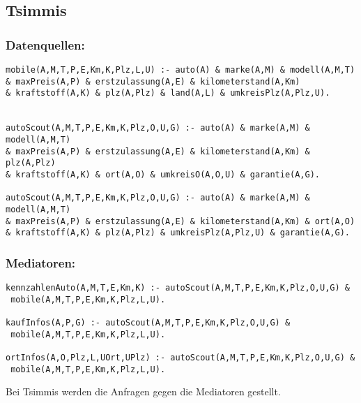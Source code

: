 \documentclass[a4paper]{article}
\begin{document}
\subsection*{Tsimmis}
\subsubsection*{Datenquellen:}
\begin{verbatim}
mobile(A,M,T,P,E,Km,K,Plz,L,U) :- auto(A) & marke(A,M) & modell(A,M,T) 
& maxPreis(A,P) & erstzulassung(A,E) & kilometerstand(A,Km) 
& kraftstoff(A,K) & plz(A,Plz) & land(A,L) & umkreisPlz(A,Plz,U).


autoScout(A,M,T,P,E,Km,K,Plz,O,U,G) :- auto(A) & marke(A,M) & modell(A,M,T) 
& maxPreis(A,P) & erstzulassung(A,E) & kilometerstand(A,Km) & plz(A,Plz)
& kraftstoff(A,K) & ort(A,O) & umkreisO(A,O,U) & garantie(A,G).

autoScout(A,M,T,P,E,Km,K,Plz,O,U,G) :- auto(A) & marke(A,M) & modell(A,M,T) 
& maxPreis(A,P) & erstzulassung(A,E) & kilometerstand(A,Km) & ort(A,O)
& kraftstoff(A,K) & plz(A,Plz) & umkreisPlz(A,Plz,U) & garantie(A,G).
\end{verbatim}

\subsubsection*{Mediatoren:}
\begin{verbatim}
kennzahlenAuto(A,M,T,E,Km,K) :- autoScout(A,M,T,P,E,Km,K,Plz,O,U,G) &
 mobile(A,M,T,P,E,Km,K,Plz,L,U).

kaufInfos(A,P,G) :- autoScout(A,M,T,P,E,Km,K,Plz,O,U,G) &
 mobile(A,M,T,P,E,Km,K,Plz,L,U).

ortInfos(A,O,Plz,L,UOrt,UPlz) :- autoScout(A,M,T,P,E,Km,K,Plz,O,U,G) &
 mobile(A,M,T,P,E,Km,K,Plz,L,U).
\end{verbatim}
Bei Tsimmis werden die Anfragen gegen die Mediatoren gestellt.
\end{document}
